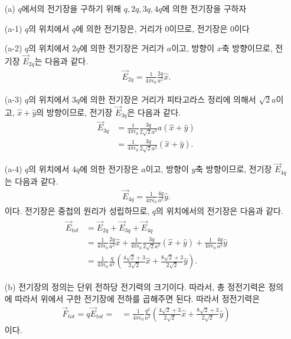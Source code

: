 \documentclass[tightenlines,floatfix,nofootinbib,superscriptaddress,fleqn]{revtex4}
\begin{document}
\begin{itemize}
  \item[(a)] 
  $q$에서의 전기장을 구하기 위해 $q,2q,3q,4q$에 의한 전기장을 구하자
  \item[(a-1)]
  $q$의 위치에서 $q$에 의한 전기장은, 거리가 $0$이므로, 전기장은 0이다
  \item[(a-2)]
  $q$의 위치에서 $2q$에 의한 전기장은 거리가 $a$이고, 방향이 $x$축 방향이므로,
  전기장 $\vec{E}_{2q}$는 다음과 같다.
  \begin{align}
    \vec{E}_{2q}=\frac{1}{4\pi\epsilon_0}\frac{2q}{a^2}\hat{x}.
  \end{align}
  \item[(a-3)]
  $q$의 위치에서 $3q$에 의한 전기장은 거리가 피타고라스 정리에 의해서
  $\sqrt{2}a$이고, $\hat{x}+\hat{y}$의 방향이므로, 전기장 $\vec{E}_{3q}$은 다음과 같다.
  \begin{align}
    \vec{E}_{3q}&=\frac{1}{4\pi\epsilon_0}\frac{3q}{2\sqrt{2}a^3}a\left(\hat{x}+\hat{y}\right)\\
    &=\frac{1}{4\pi\epsilon_0}\frac{3q}{2\sqrt{2}a^2}\left(\hat{x}+\hat{y}\right).
  \end{align}
  \item[(a-4)]
  $q$의 위치에서 $4q$에 의한 전기장은 $a$이고, 방향이 $y$축 방향이므로,
  전기장 $\vec{E}_{4q}$는 다음과 같다.
  \begin{align}
    \vec{E}_{4q}=\frac{1}{4\pi\epsilon_0}\frac{4q}{a^2}\hat{y}.
  \end{align}
  이다. 전기장은 중첩의 원리가 성립하므로, $q$의 위치에서의 전기장은
  다음과 같다.
  \begin{align}
    \begin{split}
      \vec{E}_{tot}&=\vec{E}_{2q}+\vec{E}_{3q}+\vec{E}_{4q}\\
      &=\frac{1}{4\pi\epsilon_0}\frac{2q}{a^2}\hat{x}+\frac{1}{4\pi\epsilon_0}\frac{3q}{2\sqrt{2}a^2}\left(\hat{x}+\hat{y}\right)+\frac{1}{4\pi\epsilon_0}\frac{4q}{a^2}\hat{y}\\
      &=\frac{1}{4\pi\epsilon_0}\frac{q}{a^2}\left(\frac{4\sqrt{2}+3}{2\sqrt{2}}\hat{x}+\frac{8\sqrt{2}+3}{2\sqrt{2}}\hat{y}\right).
    \end{split}
  \end{align}
  \item[(b)]
  전기장의 정의는 단위 전하당 전기력의 크기이다. 따라서, 총 정전기력은
  정의에 따라서 위에서 구한 전기장에 전하를 곱해주면 된다. 따라서 정전기력은
  \begin{align}
    \vec{F}_{tot}=q\vec{E}_{tot}=&=\frac{1}{4\pi\epsilon_0}\frac{q^2}{a^2}\left(\frac{4\sqrt{2}+3}{2\sqrt{2}}\hat{x}+\frac{8\sqrt{2}+3}{2\sqrt{2}}\hat{y}\right)
  \end{align}
  이다.
  \end{itemize}
\vspace{1.cm}
\end{document}
